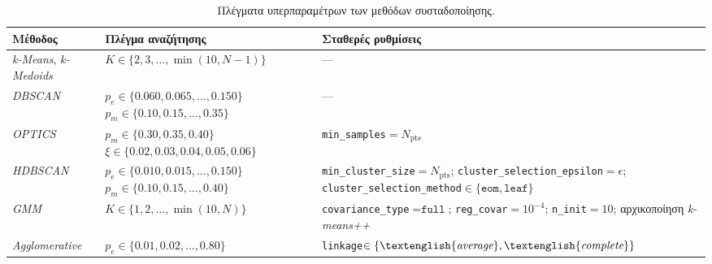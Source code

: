\begin{table}[htbp]
    \centering
    \caption{Πλέγματα υπερπαραμέτρων των μεθόδων συσταδοποίησης.}
    \label{tab:amb:hyperparameter-grids}
    \footnotesize
    \setlength{\tabcolsep}{5pt}
    \renewcommand{\arraystretch}{1.35}
    \begin{tabular}{
        >{\raggedright\arraybackslash}p{}
        >{\raggedright\arraybackslash}p{}
        >{\raggedright\arraybackslash}p{}}
        \toprule
        \textbf{Μέθοδος} & \textbf{Πλέγμα αναζήτησης} & \textbf{Σταθερές ρυθμίσεις} \\
        \midrule
        \textenglish{\textit{k-Means}}, \textenglish{\textit{k-Medoids}}
        & $K\in\{2,3,\ldots,\min(10,N-1)\}$
        & --- \\
        \textenglish{\textit{DBSCAN}}
        & $p_e\in\{0.060,0.065,\ldots,0.150\}$\newline
          $p_m\in\{0.10,0.15,\ldots,0.35\}$
        & --- \\
        \textenglish{\textit{OPTICS}}
        & $p_m\in\{0.30,0.35,0.40\}$\newline
          $\xi\in\{0.02,0.03,0.04,0.05,0.06\}$
        & \texttt{min\_samples}$=N_{\mathrm{pts}}$ \\
        \textenglish{\textit{HDBSCAN}}
        & $p_e\in\{0.010,0.015,\ldots,0.150\}$\newline
          $p_m\in\{0.10,0.15,\ldots,0.40\}$
        & \texttt{min\_cluster\_size}$=N_{\mathrm{pts}}$;\newline
          \texttt{cluster\_selection\_epsilon}$=\epsilon$;\newline
          \texttt{cluster\_selection\_method}$\in\{\texttt{eom},\texttt{leaf}\}$ \\
        \textenglish{\textit{GMM}}
        & $K\in\{1,2,\ldots,\min(10,N)\}$
        & \texttt{covariance\_type}$=\texttt{full}$;\newline
          \texttt{reg\_covar}$=10^{-4}$;\newline
          \texttt{n\_init}$=10$;\newline
          αρχικοποίηση \textit{k-means++} \\
        \textenglish{\textit{Agglomerative}}
        & $p_e\in\{0.01,0.02,\ldots,0.80\}$
        & \texttt{linkage}$\in\{\textenglish{\textit{average}},\textenglish{\textit{complete}}\}$ \\
        \bottomrule
    \end{tabular}
\end{table}

